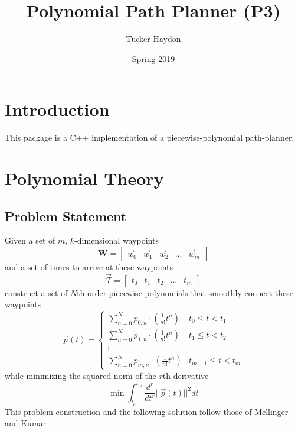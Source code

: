 \documentclass[12pt]{article}
\title{Polynomial Path Planner (P3)}
\author{Tucker Haydon}
\date{Spring 2019}
\begin{document}
\maketitle

\section{Introduction}
This package is a C++ implementation of a piecewise-polynomial path-planner.

\section{Polynomial Theory}
\subsection{Problem Statement}
Given a set of $m$, $k$-dimensional waypoints 
%
\begin{equation}
  \mathbf{W} = 
  \begin{bmatrix}
    \vec{w}_{0} & \vec{w}_{1} & \vec{w}_{2} & \hdots & \vec{w}_{m}
  \end{bmatrix}
\end{equation}
%
and a set of times to arrive at these waypoints 
\begin{equation}
  \vec{T} = 
  \begin{bmatrix}
    t_{0} & t_{1} & t_{2} & \hdots & t_{m}
  \end{bmatrix}
\end{equation}
%
construct a set of $N$th-order piecewise polynomials that smoothly connect these waypoints
%
\begin{equation}
  \vec{p}(t) = 
  \begin{cases}
    \sum_{n=0}^{N} p_{0,n} \cdot (\frac{1}{n!} t^{n}) & t_{0} \leq t < t_{1} \\ 
    \sum_{n=0}^{N} p_{1,n} \cdot (\frac{1}{n!} t^{n}) & t_{1} \leq t < t_{2} \\ 
    \vdots \\
    \sum_{n=0}^{N} p_{m,n} \cdot (\frac{1}{n!} t^{n}) & t_{m-1} \leq t < t_{m}
  \end{cases}
\end{equation}
%
while minimizing the squared norm of the $r$th derivative
%
\begin{equation}
  \min
  \int_{t_{0}}^{t_{m}} \frac{d^{r}}{dt^{r}}|| \vec{p}(t) ||^{2} dt
\end{equation}
%
This problem construction and the following solution follow those of Mellinger
and Kumar \cite{mellinger2011minimum}.
\end{document}
